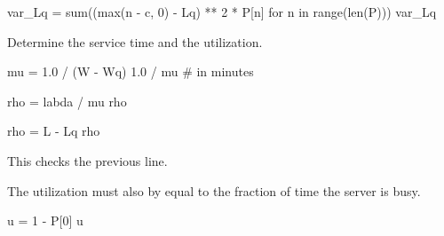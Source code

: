 \documentclass[companion]{subfiles}
\begin{document}
\begin{extra}[Hall 5.3]
\begin{solution}
\begin{pyconsole}
var_Lq = sum((max(n - c, 0) - Lq) ** 2 * P[n] for n in range(len(P)))
var_Lq
\end{pyconsole}

Determine the service time and the utilization.
\begin{pyconsole}
mu = 1.0 / (W - Wq)
1.0 / mu  # in minutes

rho = labda / mu
rho
\end{pyconsole}

\begin{pyconsole}
rho = L - Lq
rho
\end{pyconsole}
This checks the previous line.

The utilization must also by equal to the fraction of time the server is busy. 
\begin{pyconsole}
u = 1 - P[0]
u
\end{pyconsole}
\end{solution}
\end{extra} 
\end{document}
